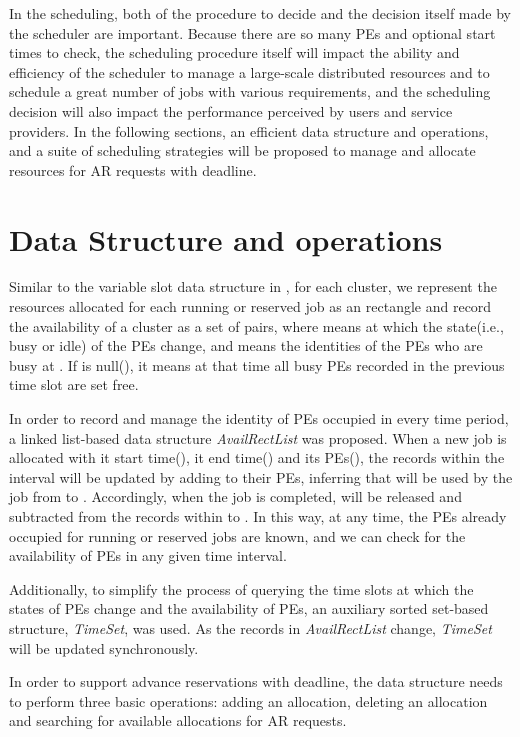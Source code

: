 \documentclass[preprint,12pt]{elsarticle}
\begin{document}
In the scheduling, both of the procedure to decide and the decision itself made by the scheduler are important. Because there are so many PEs and optional start times to check, the scheduling procedure itself will impact the ability and efficiency of the scheduler to manage a large-scale distributed resources and to schedule a great number of jobs with various requirements, and the scheduling decision will also impact the performance perceived by users and service providers. In the following sections, an efficient data structure and operations, and a suite of scheduling strategies will be proposed to manage and allocate resources for AR requests with deadline.


\section{Data Structure and operations}

Similar to the variable slot data structure in \cite{kunrath2008towards}, for each cluster, we represent the resources allocated for each running or reserved job as an rectangle and record the availability of a cluster as a set of  pairs, where  means at which the state(i.e., busy or idle) of the PEs change, and  means the identities of the PEs who are busy at . If  is null(), it means at that time all busy PEs recorded in the previous time slot are set free.

In order to record and manage the identity of PEs occupied in every time period, a linked list-based data structure \emph{AvailRectList} was proposed. When a new job is allocated with it start time(), it end time() and its PEs(), the records within the interval  will be updated by adding  to their PEs, inferring that  will be used by the job from  to . Accordingly, when the job is completed,  will be released and subtracted from the records within  to . In this way, at any time, the PEs already occupied for running or reserved jobs are known, and we can check for the availability of PEs in any given time interval.

Additionally, to simplify the process of querying the time slots at which the states of PEs change and the availability of PEs, an auxiliary sorted set-based structure, {\em TimeSet}, was used. As the records in \emph{AvailRectList} change, {\em TimeSet} will be updated synchronously.

In order to support advance reservations with deadline, the data structure needs to perform three basic operations: adding an allocation, deleting an allocation and searching for available allocations for AR requests.
\end{document}
